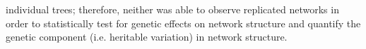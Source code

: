 \documentclass{article}
\begin{document}
%
%
%
%
%
%
individual trees; therefore, neither was able to observe replicated networks in order to statistically test for genetic
effects on network structure and quantify the genetic component (i.e. heritable variation) in network structure. 
\end{document}
